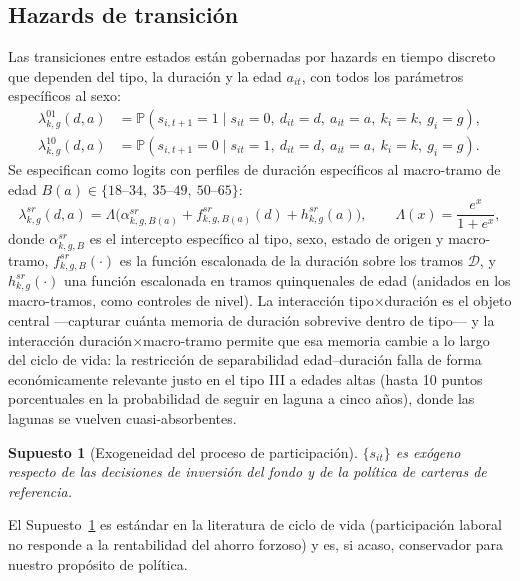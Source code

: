 \documentclass[11pt]{article}
\newtheorem{assumption}{Supuesto}
\newcommand{\Prob}{\mathbb{P}}
\begin{document}
\subsection{Hazards de transición}

Las transiciones entre estados están gobernadas por hazards en tiempo
discreto que dependen del tipo, la duración y la edad $a_{it}$, con todos los
parámetros específicos al sexo:
\begin{align}
\lambda^{01}_{k,g}(d, a) &= \Prob\left(s_{i,t+1} = 1 \mid s_{it} = 0,\
d_{it} = d,\ a_{it} = a,\ k_i = k,\ g_i = g\right), \\
\lambda^{10}_{k,g}(d, a) &= \Prob\left(s_{i,t+1} = 0 \mid s_{it} = 1,\
d_{it} = d,\ a_{it} = a,\ k_i = k,\ g_i = g\right).
\end{align}
Se especifican como logits con perfiles de duración específicos al
macro-tramo de edad $B(a) \in \{18\text{--}34,\ 35\text{--}49,\
50\text{--}65\}$:
\begin{equation}
\lambda^{sr}_{k,g}(d, a) = \Lambda\bigl(\alpha^{sr}_{k,g,B(a)} +
f^{sr}_{k,g,B(a)}(d) + h^{sr}_{k,g}(a)\bigr), \qquad
\Lambda(x) = \frac{e^x}{1+e^x},
\label{eq:logit}
\end{equation}
donde $\alpha^{sr}_{k,g,B}$ es el intercepto específico al tipo, sexo,
estado de origen y macro-tramo, $f^{sr}_{k,g,B}(\cdot)$ es la función
escalonada de la duración sobre los tramos $\mathcal{D}$, y
$h^{sr}_{k,g}(\cdot)$ una función escalonada en tramos quinquenales de edad
(anidados en los macro-tramos, como controles de nivel). La interacción
tipo$\times$duración es el objeto central —capturar cuánta memoria de
duración sobrevive dentro de tipo— y la interacción
duración$\times$macro-tramo permite que esa memoria cambie a lo largo del
ciclo de vida: la restricción de separabilidad edad--duración falla de
forma económicamente relevante justo en el tipo III a edades altas
(hasta 10 puntos porcentuales en la probabilidad de seguir en laguna a
cinco años), donde las lagunas se vuelven cuasi-absorbentes.

\begin{assumption}[Exogeneidad del proceso de participación]
\label{as:exo}
$\{s_{it}\}$ es exógeno respecto de las decisiones de inversión del fondo y
de la política de carteras de referencia.
\end{assumption}

El Supuesto~\ref{as:exo} es estándar en la literatura de ciclo de vida
(participación laboral no responde a la rentabilidad del ahorro forzoso) y
es, si acaso, conservador para nuestro propósito de política.
\end{document}
